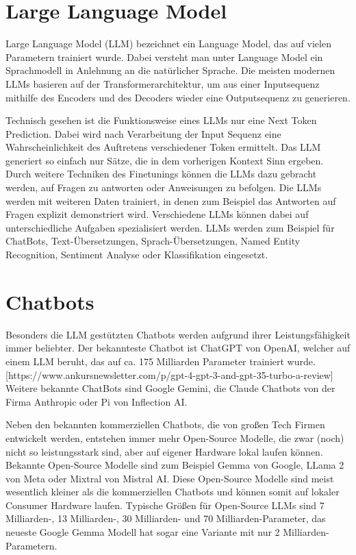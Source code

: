 \section{Large Language Model}

Large Language Model (LLM) bezeichnet ein Language Model, das auf vielen Parametern trainiert wurde. 
Dabei versteht man unter Language Model ein Sprachmodell in Anlehnung an die natürlicher Sprache.
Die meisten modernen LLMs basieren auf der Transformerarchitektur, um aus einer Inputsequenz mithilfe des Encoders und des Decoders wieder eine Outputsequenz zu generieren.


Technisch gesehen ist die Funktionsweise eines LLMs nur eine Next Token Prediction.
Dabei wird nach Verarbeitung der Input Sequenz eine Wahrscheinlichkeit des Auftretens verschiedener Token ermittelt.
Das LLM generiert so einfach nur Sätze, die in dem vorherigen Kontext Sinn ergeben.
Durch weitere Techniken des Finetunings können die LLMs dazu gebracht werden, auf Fragen zu antworten oder Anweisungen zu befolgen.
Die LLMs werden mit weiteren Daten trainiert, in denen zum Beispiel das Antworten auf Fragen explizit demonstriert wird.
Verschiedene LLMs können dabei auf unterschiedliche Aufgaben spezialisiert werden.
LLMs werden zum Beispiel für ChatBots, Text-Übersetzungen, Sprach-Übersetzungen, Named Entity Recognition, Sentiment Analyse oder Klassifikation eingesetzt.



\section{Chatbots}

Besonders die LLM gestützten Chatbots werden aufgrund ihrer Leistungsfähigkeit immer beliebter.
Der bekannteste Chatbot ist ChatGPT von OpenAI, welcher auf einem LLM beruht, das auf ca. 175 Milliarden Parameter trainiert wurde. [https://www.ankursnewsletter.com/p/gpt-4-gpt-3-and-gpt-35-turbo-a-review]
Weitere bekannte ChatBots sind Google Gemini, die Claude Chatbots von der Firma Anthropic oder Pi von Inflection AI.

Neben den bekannten kommerziellen Chatbots, die von großen Tech Firmen entwickelt werden, entstehen immer mehr Open-Source Modelle, die zwar (noch) nicht so leistungsstark sind, aber auf eigener Hardware lokal laufen können.
Bekannte Open-Source Modelle sind zum Beispiel Gemma von Google, LLama 2 von Meta oder Mixtral von Mistral AI.
Diese Open-Source Modelle sind meist wesentlich kleiner als die kommerziellen Chatbots und können somit auf lokaler Consumer Hardware laufen.
Typische Größen für Open-Source LLMs sind 7 Milliarden-, 13 Milliarden-, 30 Milliarden- und 70 Milliarden-Parameter, das neueste Google Gemma Modell hat sogar eine Variante mit nur 2 Milliarden-Parametern.


